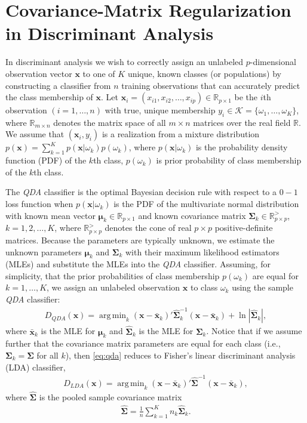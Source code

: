 \documentclass[11pt]{article}
\newcommand{\xbar}{\bar{\bm x}}
\DeclareMathOperator*{\argmin}{arg\,min}
\begin{document}
\section{Covariance-Matrix Regularization in Discriminant Analysis}

In discriminant analysis we wish to correctly assign an unlabeled $p$-dimensional observation vector $\bm x$ to one of $K$ unique, known classes (or populations) by constructing a classifier from $n$ training observations that can accurately predict the class membership of $\bm x$. Let $\bm x_i = (x_{i1}, x_{i2}, \ldots, x_{ip}) \in \mathbb{R}_{p \times 1}$ be the $i$th observation $(i = 1, \ldots, n)$ with true, unique membership $y_i \in \mathcal{K} = \{\omega_1, \ldots, \omega_K\}$, where $\mathbb{R}_{m \times n}$ denotes the matrix space of all $m \times n$ matrices over the real field $\mathbb{R}$. We assume that $(\bm x_i, y_i)$ is a realization from a mixture distribution $p(\bm x) = \sum_{k=1}^K p(\bm x | \omega_k) p(\omega_k)$, where $p(\bm x | \omega_k)$ is the probability density function (PDF) of the $k$th class, $p(\omega_k)$ is prior probability of class membership of the $k$th class.

The \emph{QDA} classifier is the optimal Bayesian decision rule with respect to a $0-1$ loss function when $p(\bm x | \omega_k)$ is the PDF of the multivariate normal distribution with known mean vector  $\bm\mu_k \in \mathbb{R}_{p \times 1}$ and known covariance matrix $\bm\Sigma_k \in \mathbb{R}_{p \times p}^{>}$, $k = 1, 2, \ldots, K$, where $\mathbb{R}_{p \times p}^{>}$ denotes the cone of real $p \times p$ positive-definite matrices. Because the parameters are typically unknown, we estimate the unknown parameters $\bm \mu_k$ and $\bm\Sigma_k$ with their maximum likelihood estimators (MLEs) and substitute the MLEs into the \emph{QDA} classifier. Assuming, for simplicity, that the prior probabilities of class membership $p(\omega_k)$ are equal for $k = 1, \ldots, K$, we assign an unlabeled observation $\bm x$ to class $\omega_k$ using the sample \emph{QDA} classifier:
\begin{align}
	D_{QDA}(\bm x) = \argmin_{k}  (\bm x - \xbar_k)'\widehat{\bm\Sigma}_k^{-1}(\bm x - \xbar_k)  + \ln |\widehat{\bm\Sigma}_k|, \label{eq:qda}
\end{align}
where $\xbar_k$ is the MLE for $\bm \mu_k$ and  $\widehat{\bm\Sigma}_k$ is the MLE for $\bm \Sigma_k$. Notice that if we assume further that the covariance matrix parameters are equal for each class (i.e., $\bm\Sigma_k = \bm\Sigma$ for all $k$), then \eqref{eq:qda} reduces to Fisher's linear discriminant analysis (LDA) classifier,
\begin{align}
	D_{LDA}(\bm x) = \argmin_{k}  (\bm x - \xbar_k)'\widehat{\bm\Sigma}^{-1}(\bm x - \xbar_k), \label{eq:lda}
\end{align}
where $\widehat{\bm\Sigma}$ is the pooled sample covariance matrix
\begin{align}
	\widehat{\bm\Sigma} = \frac{1}{n} \sum_{k=1}^K n_k \widehat{\bm\Sigma}_k. \label{eq:pooled-cov}
\end{align}
\end{document}
